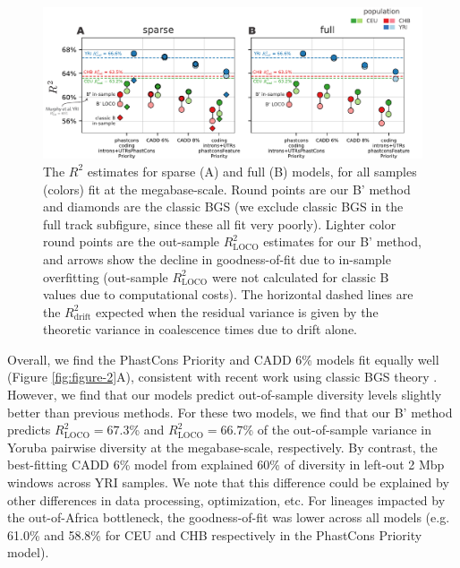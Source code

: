 \documentclass[11pt]{article}
\begin{document}
\begin{figure}[htbp] \centering
    \includegraphics[width=\textwidth]{figures/figure_3.pdf} 

    \caption{The $R^2$ estimates for sparse (A) and full (B) models, for all
        samples (colors) fit at the megabase-scale. Round points are our B'
        method and diamonds are the classic BGS (we exclude classic BGS in the
        full track subfigure, since these all fit very poorly). Lighter color
        round points are the out-sample $R_\text{LOCO}^2$ estimates for our B'
        method, and arrows show the decline in goodness-of-fit due to in-sample
        overfitting (out-sample $R_\text{LOCO}^2$ were not calculated for
        classic B values due to computational costs). The horizontal dashed
        lines are the $R_\text{drift}^2$ expected when the residual variance is
    given by the theoretic variance in coalescence times due to drift alone.}

  \label{fig:figure-3}
\end{figure}

Overall, we find the PhastCons Priority and CADD 6\% models fit equally
well (Figure \ref{fig:figure-2}A), consistent with recent work using classic
BGS theory \parencite{Murphy2022-sj}. However, we find that our models predict
out-of-sample diversity levels slightly better than previous methods. For these
two models, we find that our B' method predicts $R_\text{LOCO}^2=67.3$\% and
$R_\text{LOCO}^2=66.7$\% of the out-of-sample variance in Yoruba pairwise
diversity at the megabase-scale, respectively. By contrast, the best-fitting
CADD 6\% model from \textcite{Murphy2022-sj} explained 60\% of diversity in
left-out 2 Mbp windows across YRI samples. We note that this difference could
be explained by other differences in data processing, optimization, etc. For
lineages impacted by the out-of-Africa bottleneck, the goodness-of-fit was
lower across all models (e.g. 61.0\% and 58.8\% for CEU and CHB respectively in
the PhastCons Priority model).
\end{document}
